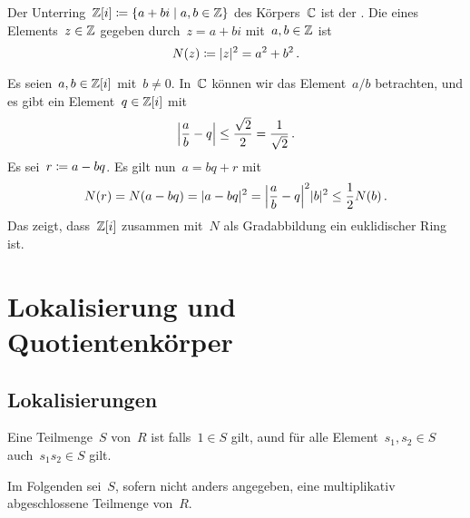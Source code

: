 \begin{example}
  Der Unterring~$\Integer[i] \defined \{a + bi \suchthat a, b \in \Integer\}$ des Körpers~$\Complex$ ist der .
  Die  eines Elements~$z \in \Integer$ gegeben durch~$z = a + bi$ mit~$a, b \in \Integer$ ist
  \[
    N(z)
    \defined
    \abs{z}^2
    =
    a^2 + b^2 \,.
  \]

  Es seien~$a, b \in \Integer[i]$ mit~$b \neq 0$.
  In~$\Complex$ können wir das Element~$a/b$ betrachten, und es gibt ein Element~$q \in \Integer[i]$ mit
  \[
    \abs*{ \frac{a}{b} - q }
    \leq
    \frac{\sqrt{2}}{2}
    =
    \frac{1}{\sqrt{2}} \,.
  \]
  Es sei~$r \defined a - bq$.
  Es gilt nun~$a = bq + r$ mit
  \[
    N(r)
    =
    N(a - bq)
    =
    \abs{a-bq}^2
    =
    \abs*{ \frac{a}{b} - q }^2 \abs{b}^2
    \leq
    \frac{1}{2} N(b) \,.
  \]
  Das zeigt, dass~$\Integer[i]$ zusammen mit~$N$ als Gradabbildung ein euklidischer Ring ist.
\end{example}





\section{Lokalisierung und Quotientenkörper}



\subsection{Lokalisierungen}

\begin{definition}
  Eine Teilmenge~$S$ von~$R$ ist  falls~$1 \in S$ gilt, aund für alle Element~$s_1, s_2 \in S$ auch~$s_1 s_2 \in S$ gilt.
\end{definition}

\begin{convention}
  Im Folgenden sei~$S$, sofern nicht anders angegeben, eine multiplikativ abgeschlossene Teilmenge von~$R$.
\end{convention}

